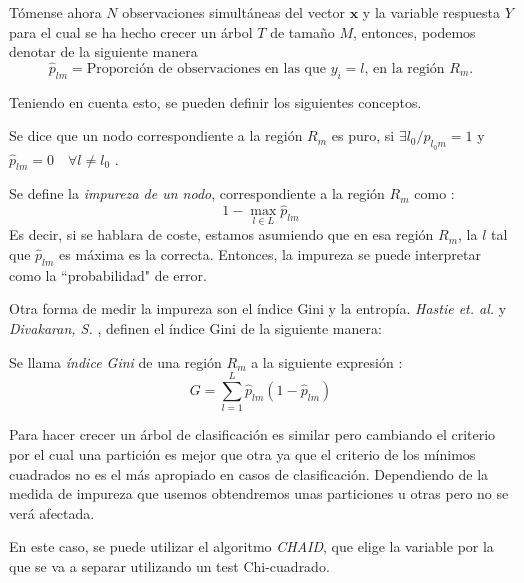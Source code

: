 \noindent Tómense ahora $N$ observaciones simultáneas del vector $\mathbf{x}$ y la variable respuesta $Y$ para el cual se ha hecho crecer un árbol $T$ de tamaño $M$, entonces, podemos denotar de la siguiente manera \cite{Divakaran 2022, Brown 2004}
\begin{equation}
\hat{p}_{lm}=\text{Proporción de observaciones en las que $y_i=l$, en la región $R_m$.}
\end{equation}

\noindent Teniendo en cuenta esto, se pueden definir los siguientes conceptos.
\begin{defi}
Se dice que un nodo correspondiente a la región $R_m$ es puro, si $\exists l_0/ p_{l_0 m}=1$ y $\hat{p}_{lm}=0 \quad \forall l\neq l_0$ \cite{Divakaran 2022, Hastie 2001, James 2013, Brown 2004}. 
\end{defi}

\begin{defi}
Se define la \emph{impureza de un nodo}, correspondiente a la región $R_m$ como \cite{Brown 2004}:
\begin{equation}
1-\max_{l\in L} \hat{p}_{lm}
\end{equation}
\noindent Es decir, si se hablara de coste, estamos asumiendo que en esa región $R_m$, la $l$ tal que $\hat{p}_{lm}$ es máxima es la correcta. Entonces, la impureza se puede interpretar como la ``probabilidad" de error. 
\end{defi}
\noindent Otra forma de medir la impureza son el índice Gini y la entropía. \emph{Hastie et. al.} y \emph{Divakaran, S.} \cite{Hastie 2001, Divakaran 2022}, definen el índice Gini de la siguiente manera:
\begin{defi}
Se llama \emph{índice Gini} de una región $R_m$ a la siguiente expresión \cite{Hastie 2001, James 2013}:
\begin{equation}
G=\sum_{l=1}^L\hat{p}_{lm}(1-\hat{p}_{lm})
\end{equation}
\end{defi}

\noindent Para hacer crecer un árbol de clasificación es similar pero cambiando el criterio por el cual una partición es mejor que otra ya que el criterio de los mínimos cuadrados no es el más apropiado en casos de clasificación. Dependiendo de la medida de impureza que usemos obtendremos unas particiones u otras pero no se verá afectada. 

\noindent En este caso, se puede utilizar el algoritmo \emph{CHAID}, que elige la variable por la que se va a separar utilizando un test Chi-cuadrado. 
